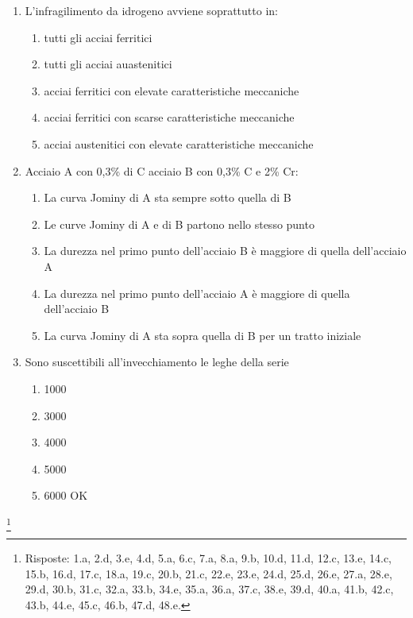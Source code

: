 \begin{enumerate}
\begin{enumerate}
        \item 500°C per 1 ora
        \item 723°C per 12 ore
        \item 50°C sopra la temperatura di austenizzazione
        \item oltre i 1000°C per 100 ore
    \end{enumerate}
     \item L'infragilimento da idrogeno avviene soprattutto in:
    \begin{enumerate}
        \item tutti gli acciai ferritici
        \item tutti gli acciai auastenitici
        \item acciai ferritici con elevate caratteristiche meccaniche
        \item acciai ferritici con scarse caratteristiche meccaniche
        \item acciai austenitici con elevate caratteristiche meccaniche
    \end{enumerate}
    
     \item Acciaio A con 0,3\% di C     acciaio B con 0,3\% C e 2\% Cr:
    \begin{enumerate}
        \item La curva Jominy di A sta sempre sotto quella di B
        \item Le curve Jominy di A e di B partono nello stesso punto
        \item La durezza nel primo punto dell'acciaio B è maggiore di quella dell'acciaio A
        \item La durezza nel primo punto dell'acciaio A è maggiore di quella dell'acciaio B
        \item La curva Jominy di A sta sopra quella di B per un tratto iniziale
    \end{enumerate}
     \item Sono suscettibili all'invecchiamento le leghe della serie
    \begin{enumerate}
        \item 1000
        \item 3000
        \item 4000
        \item 5000
        \item 6000 OK
    \end{enumerate}
\end{enumerate}

\footnote[0]{Risposte: 1.a, 2.d, 3.e, 4.d, 5.a, 6.c, 7.a, 8.a, 9.b, 10.d, 11.d, 12.c, 13.e, 14.c, 15.b, 16.d, 17.c, 18.a, 19.c, 20.b, 21.c, 22.e, 23.e, 24.d, 25.d, 26.e, 27.a, 28.e, 29.d, 30.b, 31.c, 32.a, 33.b, 34.e, 35.a, 36.a, 37.c, 38.e, 39.d, 40.a, 41.b, 42.c, 43.b, 44.e, 45.c, 46.b, 47.d, 48.e.}
